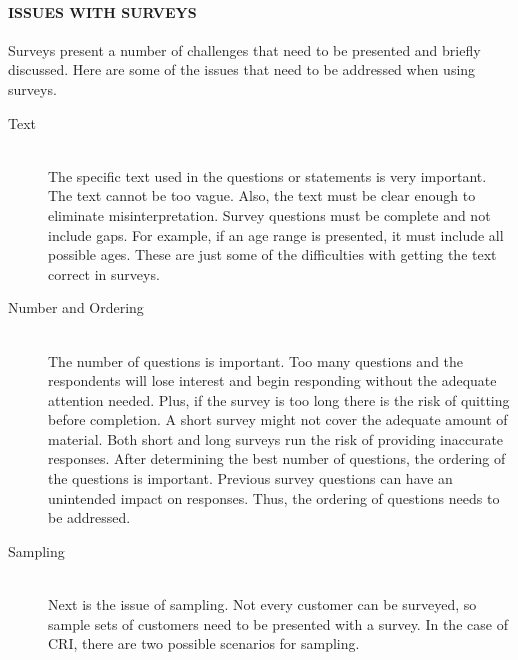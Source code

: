 \documentclass[SDSUThesis.tex]{subfiles}
\begin{document}
            \paragraph{ISSUES WITH SURVEYS}
                Surveys present a number of challenges that need to be presented and briefly
                discussed.  Here are some of the issues that need to be addressed when
                using surveys. 
                
                \begin{description}
                \item[Text] \hfill \\
                    The specific text used in the questions or statements
                    is very important.  The text cannot be too vague.  Also, the text
                    must be clear enough to eliminate misinterpretation. Survey
                    questions must be complete and not include gaps.  For example, if
                    an age range is presented, it must include all possible ages.  These
                    are just some of the difficulties with getting the text correct
                    in surveys. 
                \item[Number and Ordering] \hfill \\
                    The number of questions is important.  Too many questions and the 
                    respondents will lose interest and begin responding without the
                    adequate attention needed.  Plus, if the survey is too long there
                    is the risk of quitting before completion.  A short survey might
                    not cover the adequate amount of material.  Both short and long
                    surveys run the risk of providing inaccurate responses.  After
                    determining the best number of questions, the ordering of the questions
                    is important.  Previous survey questions can have an unintended 
                    impact on responses.  Thus, the ordering of questions needs to be
                    addressed. 
                \item[Sampling] \hfill \\
                    Next is the issue of sampling.  Not every customer can be surveyed, so 
                    sample sets of customers need to be presented with a survey.  
                    In the case of CRI, there are two possible scenarios for sampling.  
                    \begin{enumerate}

\end{enumerate}
\end{description}
\end{document}
